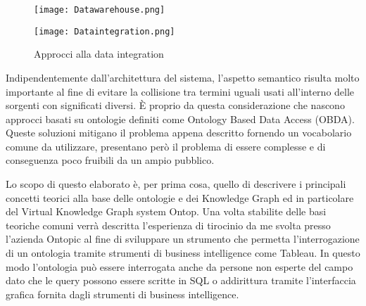 \begin{figure}[ht]
    \centering
    \begin{minipage}{0.45\linewidth}
        \centering
        \texttt{[image: Datawarehouse.png]}
    \end{minipage}
    \begin{minipage}{0.45\linewidth}
        \centering
        \texttt{[image: Dataintegration.png]}
    \end{minipage}
    \caption{Approcci alla data integration}
    \label{fig:dataIntegration}
\end{figure}
Indipendentemente dall'architettura del sistema, l'aspetto semantico risulta molto importante al fine di evitare la collisione tra termini uguali usati all'interno delle sorgenti con significati
diversi. \`E proprio da questa considerazione che nascono approcci basati su ontologie definiti come Ontology Based Data Access (OBDA). Queste soluzioni mitigano il problema appena descritto fornendo un vocabolario 
comune da utilizzare, presentano però il problema di essere complesse e di conseguenza poco fruibili da un ampio pubblico.

Lo scopo di questo elaborato è, per prima cosa, quello di descrivere i principali concetti teorici alla base delle ontologie e dei Knowledge Graph ed in particolare del Virtual Knowledge Graph system Ontop. Una volta stabilite delle
basi teoriche comuni verrà descritta l'esperienza di tirocinio da me svolta presso l'azienda Ontopic al fine di sviluppare un strumento che permetta l'interrogazione di un ontologia tramite strumenti di business intelligence 
come Tableau. In questo modo l'ontologia può essere interrogata anche da persone non esperte del campo dato che le query possono essere scritte in SQL o addirittura tramite l'interfaccia grafica fornita dagli strumenti di 
business intelligence.